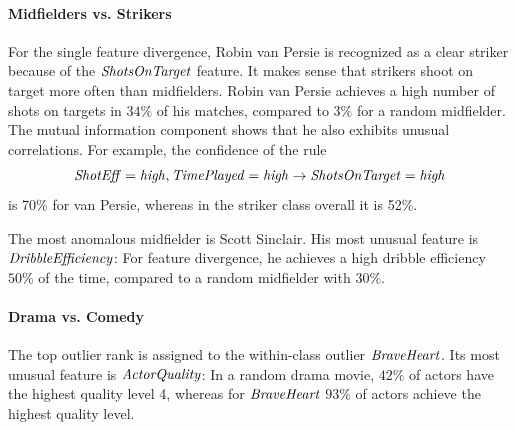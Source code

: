 \documentclass[conference]{IEEEtran}
\begin{document}
								\paragraph{Midfielders vs. Strikers} 
								
								For the single feature divergence, Robin van Persie is recognized as a clear striker because of the $\it{ShotsOnTarget}$ feature. It makes sense that strikers shoot on target more often than midfielders. Robin van Persie  achieves a high number of shots on targets in $34\%$ of his matches, compared to $3\%$ for a random midfielder. The mutual information component shows that he also exhibits  unusual correlations. For example, 
								the confidence of the rule
								$$\it{ShotEff} = \it{high}, \it{TimePlayed} = \it{high} \rightarrow \it{ShotsOnTarget} = \it{high}$$
								is 70\% for van Persie, whereas in the striker class overall it is 52\%.
								
The most anomalous midfielder is Scott Sinclair. His most unusual feature is $\it{DribbleEfficiency}$: For feature divergence, he achieves a high dribble efficiency $50\%$ of the time, compared to a random midfielder with $30\%$. 
								\paragraph{Drama vs. Comedy} 
								The top outlier rank is assigned to the within-class outlier $\it{Brave Heart}$. Its most  unusual feature is  $\it{ActorQuality}$: In a random drama movie,  $42\%$ of actors have the highest quality level 4, whereas for $\it{Brave Heart}$ $93\%$ of actors achieve the highest quality level. 
								
\end{document}
